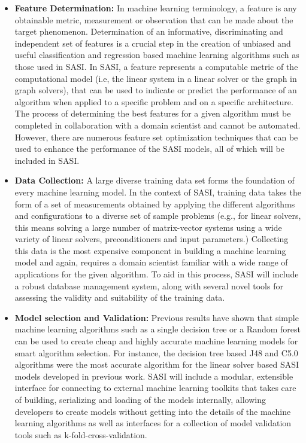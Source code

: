 \begin{itemize}
 \item {\bf Feature Determination:} In machine learning terminology, a feature is any obtainable metric, measurement or observation that can be made about the target phenomenon. Determination of an informative, discriminating and independent set of features is a crucial step in the creation of unbiased and useful classification and regression based machine learning algorithms such as those used in SASI.  In SASI, a feature represents a computable metric of the computational model (i.e, the linear system in a linear solver or the graph in graph solvers), that can be used to indicate or predict the performance of an algorithm when applied to a specific problem and on a specific architecture. The process of determining the best features for a given algorithm must be completed in collaboration with a domain scientist and cannot be automated. However, there are numerous feature set optimization techniques that can be used to enhance the performance of the SASI models, all of which will be included in SASI.  
 
 \item {\bf Data Collection:} A large diverse training data set forms the foundation of every machine learning model. In the context of SASI, training data takes the form of a set of measurements obtained by applying the different algorithms and configurations to a diverse set of sample problems (e.g., for linear solvers, this means solving a large number of matrix-vector systems using a wide variety of linear solvers, preconditioners and input parameters.) Collecting this data is the most expensive component in building a machine learning model and again, requires a domain scientist familiar with a wide range of applications for the given algorithm. To aid in this process, SASI will include a robust database management system, along with several novel tools for assessing the validity and suitability of the training data.  
 
 \item {\bf Model selection and Validation:} Previous results have shown that simple machine learning algorithms such as a single decision tree or a Random forest can be used to create cheap and highly accurate machine learning models for smart algorithm selection. For instance, the decision tree based J48 and C5.0 algorithms were the most accurate algorithm for the linear solver based SASI models developed in previous work. SASI will include a modular, extensible interface for connecting to external machine learning toolkits that takes care of building, serializing and loading of the models internally, allowing developers to create models without getting into the details of the machine learning algorithms as well as interfaces for a collection of model validation tools such as k-fold-cross-validation.    
 

\end{itemize}
